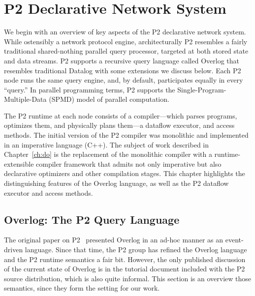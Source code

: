 \chapter[P2 Declarative Network System]{P2 Declarative Network System}
\label{ch:p2}

We begin with an overview of key aspects of the P2 declarative network system. While ostensibly a network protocol 
engine, architecturally P2 resembles a fairly traditional shared-nothing parallel query processor, targeted at both stored 
state and data streams.  P2 supports a recursive query language called Overlog that resembles traditional Datalog with 
some extensions we discuss below.  Each P2 node runs the same query engine, and, by default, participates equally 
in every ``query.''   In parallel programming terms, P2 supports the  Single-Program-Multiple-Data (SPMD) model of 
parallel computation.

The P2 runtime at each node consists of a compiler---which parses programs,
optimizes them, and physically plans them---a dataflow executor, and access methods.  
The initial version of the P2 compiler was monolithic and implemented in an imperative language (C++). 
The subject of work described in Chapter~\ref{ch:do} is the replacement of the monolithic compiler with a
runtime-extensible compiler framework that admits not only imperative
but also declarative optimizers and other compilation stages.  This chapter highlights the distinguishing 
features of the Overlog language, as well as the P2 dataflow executor and access methods. 

\section{Overlog: The P2 Query Language}
\label{ch:p2:sec:overlog}
The original paper on P2~\cite{p2:sosp} presented Overlog in an ad-hoc manner as an event-driven language. Since that time, the P2 group has refined the Overlog language and the P2 runtime semantics a fair bit.  However, the only published discussion of the current state of Overlog is in the tutorial document included with the P2 source distribution, which is also quite informal. This section is an overview those
semantics, since they form the setting for our work. 

